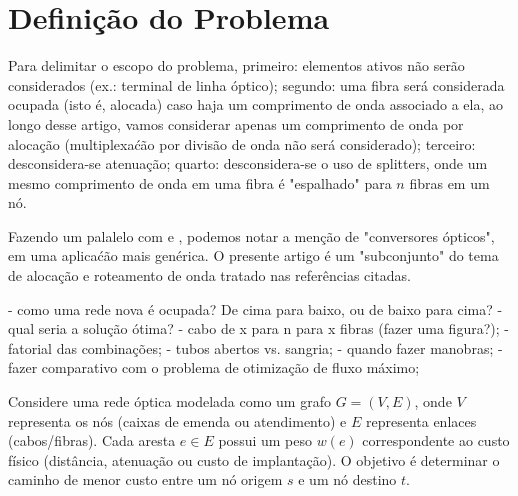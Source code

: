 \section{Definição do Problema} \label{sec:problem}

Para delimitar o escopo do problema, primeiro: elementos ativos não serão
considerados (ex.: terminal de linha óptico); segundo: uma fibra será
considerada ocupada (isto é, alocada) caso haja um comprimento de onda
associado a ela, ao longo desse artigo, vamos considerar apenas um comprimento
de onda por alocação (multiplexaćão por divisão de onda não será considerado);
terceiro: desconsidera-se atenuação; quarto: desconsidera-se o uso de
splitters, onde um mesmo comprimento de onda em uma fibra é "espalhado" para
$n$ fibras em um nó.

Fazendo um palalelo com \cite{artigorwa} e \cite{zang2000review}, podemos notar
a menção de "conversores ópticos", em uma aplicaćão mais genérica. O presente
artigo é um "subconjunto" do tema de alocação e roteamento de onda tratado nas
referências citadas.

- como uma rede nova é ocupada? De cima para baixo, ou de baixo para cima?
- qual seria a solução ótima?
- cabo de x para n para x fibras (fazer uma figura?);
- fatorial das combinações;
- tubos abertos vs. sangria;
- quando fazer manobras;
- fazer comparativo com o problema de otimização de fluxo máximo;

Considere uma rede óptica modelada como um grafo $G=(V,E)$,
onde $V$ representa os nós (caixas de emenda ou atendimento) e $E$ representa enlaces (cabos/fibras).
Cada aresta $e \in E$ possui um peso $w(e)$ correspondente ao custo físico (distância, atenuação ou custo de implantação).
O objetivo é determinar o caminho de menor custo entre um nó origem $s$ e um nó destino $t$.
